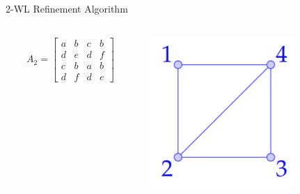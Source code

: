\documentclass{beamer}
\begin{document}
\addtocounter{framenumber}{-1}
\begin{frame}{2-WL Refinement Algorithm}
    \begin{columns}
        \begin{column}{0.7\textwidth}
        \begin{align*}
            A_2 = \begin{bmatrix}
                a&b&c&b\\
                d&e&d&f\\
                c&b&a&b\\
                d&f&d&e
            \end{bmatrix}
        \end{align*}
        \end{column}

        \begin{column}{0.3\textwidth}
            \centering
            \includegraphics[width=0.7\textwidth]{slides/pic_1.jpg}
        \end{column}
    \end{columns}
\end{frame}
\addtocounter{framenumber}{-1}
\end{document}
